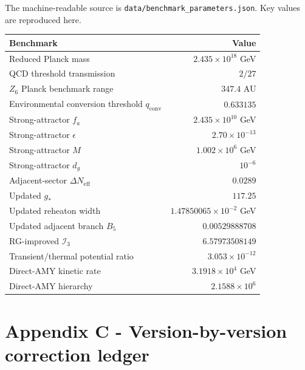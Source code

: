 \documentclass[
]{article}
\begin{document}
The machine-readable source is \texttt{data/benchmark\_parameters.json}.
Key values are reproduced here.

\begin{longtable}[]{@{}lr@{}}
\toprule\noalign{}
Benchmark & Value \\
\midrule\noalign{}
\endhead
\bottomrule\noalign{}
\endlastfoot
Reduced Planck mass & \(2.435\times10^{18}\) GeV \\
QCD threshold transmission & \(2/27\) \\
\(Z_6\) Planck benchmark range & \(347.4\) AU \\
Environmental conversion threshold \(q_{\mathrm{conv}}\) &
\(0.633135\) \\
Strong-attractor \(f_a\) & \(2.435\times10^{10}\) GeV \\
Strong-attractor \(\epsilon\) & \(2.70\times10^{-13}\) \\
Strong-attractor \(M\) & \(1.002\times10^6\) GeV \\
Strong-attractor \(d_g\) & \(10^{-6}\) \\
Adjacent-sector \(\Delta N_{\mathrm{eff}}\) & \(0.0289\) \\
Updated \(g_*\) & \(117.25\) \\
Updated reheaton width & \(1.47850065\times10^{-2}\) GeV \\
Updated adjacent branch \(B_5\) & \(0.00529888708\) \\
RG-improved \(\mathcal I_3\) & \(6.57973508149\) \\
Transient/thermal potential ratio & \(3.053\times10^{-12}\) \\
Direct-AMY kinetic rate & \(3.1918\times10^4\) GeV \\
Direct-AMY hierarchy & \(2.1588\times10^6\) \\
\end{longtable}

\section{Appendix C - Version-by-version correction
ledger}\label{appendix-c---version-by-version-correction-ledger}
\end{document}
